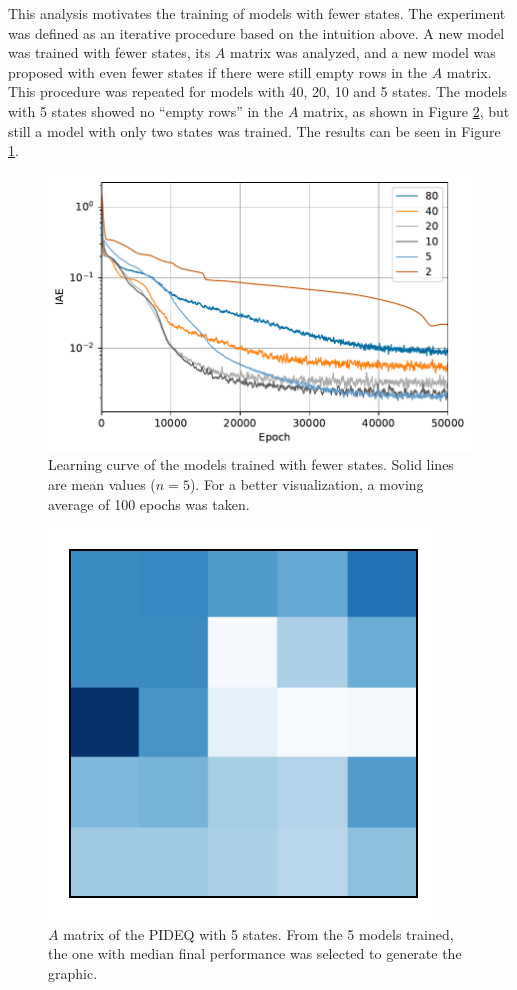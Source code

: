 This analysis motivates the training of models with fewer states.
The experiment was defined as an iterative procedure based on the intuition above.
A new model was trained with fewer states, its $A$ matrix was analyzed, and a new model was proposed with even fewer states if there were still empty rows in the $A$ matrix.
This procedure was repeated for models with 40, 20, 10 and 5 states.
The models with 5 states showed no ``empty rows'' in the $A$ matrix, as shown in Figure \ref{fig:mat-pideq-5}, but still a model with only two states was trained.
The results can be seen in Figure \ref{fig:states-iae}.

\begin{figure}[h]
    \centering
    \includegraphics{images/exp_2_iae.pdf}
    \caption{Learning curve of the models trained with fewer states. Solid lines are mean values ($n=5$). For a better visualization, a moving average of 100 epochs was taken.}
    \label{fig:states-iae}
\end{figure}

\begin{figure}[h]
    \centering
    \includegraphics{images/exp_2_matplot.pdf}
    \caption{$A$ matrix of the \gls{PIDEQ} with 5 states. From the 5 models trained, the one with median final performance was selected to generate the graphic.}
    \label{fig:mat-pideq-5}
\end{figure}

